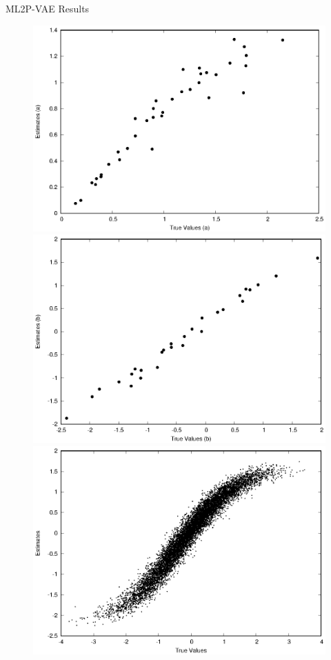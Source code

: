 \documentclass{beamer}
\theoremstyle{definition}
\begin{document}
\begin{frame}{ML2P-VAE Results}
\begin{figure}[h!]
    \includegraphics[width=\textwidth]{img/ijcnn_results/10k_a.eps}
\endminipage\hfill
{}
    \includegraphics[width=\textwidth]{img/ijcnn_results/10k_b.eps}
\endminipage\hfill
\includegraphics[width=.45\textwidth]{img/ijcnn_results/10k_t1_scaled.eps}
\end{figure}
\end{frame}
\end{document}
